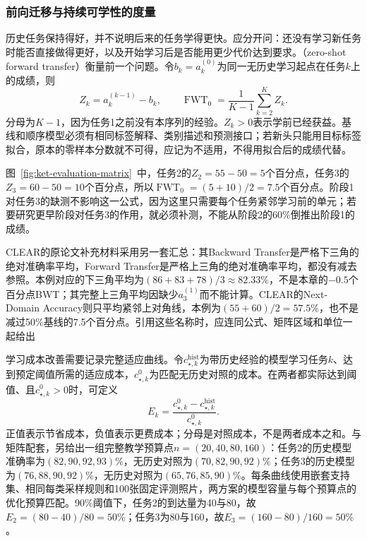 \subsubsection{前向迁移与持续可学性的度量}
\label{sec:ket-evaluation-forward}

历史任务保持得好，并不说明后来的任务学得更快。应分开问：还没有学习新任务时能否直接做得更好，以及开始学习后是否能用更少代价达到要求。（zero-shot forward transfer）衡量前一个问题。令$b_k=a_k^{(0)}$为同一无历史学习起点在任务$k$上的成绩，则
\begin{equation}
  Z_k=a_k^{(k-1)}-b_k,\qquad
  \operatorname{FWT}_0
  =\frac1{K-1}\sum_{k=2}^{K}Z_k.
  \label{eq:ket-evaluation-zero-forward}
\end{equation}
分母为$K-1$，因为任务1之前没有本序列的经验。$Z_k>0$表示学前已经获益。基线和顺序模型必须有相同标签解释、类别描述和预测接口；若新头只能用目标标签拟合，原本的零样本分数就不可得，应记为不适用，不得用拟合后的成绩代替。

图~\ref{fig:ket-evaluation-matrix}~中，任务2的$Z_2=55-50=5$个百分点，任务3的$Z_3=60-50=10$个百分点，所以$\operatorname{FWT}_0=(5+10)/2=7.5$个百分点。阶段1对任务3的缺测不影响这一公式，因为这里只需要每个任务紧邻学习前的单元；若要研究更早阶段对任务3的作用，就必须补测，不能从阶段2的60\%倒推出阶段1的成绩。

CLEAR的原论文补充材料采用另一套汇总：其Backward Transfer是严格下三角的绝对准确率平均，Forward Transfer是严格上三角的绝对准确率平均，都没有减去参照。本例对应的下三角平均为$(86+83+78)/3\approx82.33\%$，不是本章的$-0.5$个百分点BWT；其完整上三角平均因缺少$a_3^{(1)}$而不能计算。CLEAR的Next-Domain Accuracy则只平均紧邻上对角线，本例为$(55+60)/2=57.5\%$，也不是减过50\%基线的7.5个百分点。引用这些名称时，应连同公式、矩阵区域和单位一起给出

学习成本改善需要记录完整适应曲线。令$c_{\star,k}^{\mathrm{hist}}$为带历史经验的模型学习任务$k$、达到预定阈值所需的适应成本，$c_{\star,k}^{0}$为匹配无历史对照的成本。在两者都实际达到阈值、且$c_{\star,k}^{0}>0$时，可定义
\begin{equation}
  E_k=\frac{c_{\star,k}^{0}-c_{\star,k}^{\mathrm{hist}}}
             {c_{\star,k}^{0}}.
  \label{eq:ket-evaluation-learning-cost-gain}
\end{equation}
正值表示节省成本，负值表示更费成本；分母是对照成本，不是两者成本之和。与矩阵配套，另给出一组完整教学预算点$n=(20,40,80,160)$：任务2的历史模型准确率为$(82,90,92,93)\%$，无历史对照为$(70,82,90,92)\%$；任务3的历史模型为$(76,88,90,92)\%$，无历史对照为$(65,76,85,90)\%$。每条曲线使用嵌套支持集、相同每类采样规则和100张固定评测照片，两方案的模型容量与每个预算点的优化预算匹配。90\%阈值下，任务2的到达量为40与80，故$E_2=(80-40)/80=50\%$；任务3为80与160，故$E_3=(160-80)/160=50\%$。

